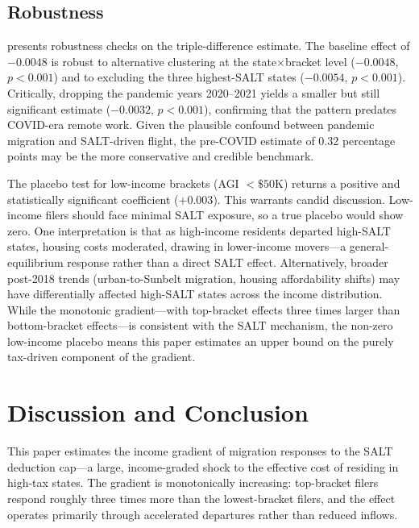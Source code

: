 \documentclass[12pt]{article}
\begin{document}
\subsection{Robustness}

 presents robustness checks on the triple-difference estimate. The baseline effect of $-0.0048$ is robust to alternative clustering at the state$\times$bracket level ($-0.0048$, $p < 0.001$) and to excluding the three highest-SALT states ($-0.0054$, $p < 0.001$). Critically, dropping the pandemic years 2020--2021 yields a smaller but still significant estimate ($-0.0032$, $p < 0.001$), confirming that the pattern predates COVID-era remote work. Given the plausible confound between pandemic migration and SALT-driven flight, the pre-COVID estimate of 0.32 percentage points may be the more conservative and credible benchmark.



The placebo test for low-income brackets (AGI $< \$50$K) returns a positive and statistically significant coefficient ($+0.003$). This warrants candid discussion. Low-income filers should face minimal SALT exposure, so a true placebo would show zero. One interpretation is that as high-income residents departed high-SALT states, housing costs moderated, drawing in lower-income movers---a general-equilibrium response rather than a direct SALT effect. Alternatively, broader post-2018 trends (urban-to-Sunbelt migration, housing affordability shifts) may have differentially affected high-SALT states across the income distribution. While the monotonic gradient---with top-bracket effects three times larger than bottom-bracket effects---is consistent with the SALT mechanism, the non-zero low-income placebo means this paper estimates an upper bound on the purely tax-driven component of the gradient.


\section{Discussion and Conclusion}

This paper estimates the income gradient of migration responses to the SALT deduction cap---a large, income-graded shock to the effective cost of residing in high-tax states. The gradient is monotonically increasing: top-bracket filers respond roughly three times more than the lowest-bracket filers, and the effect operates primarily through accelerated departures rather than reduced inflows.
\end{document}
